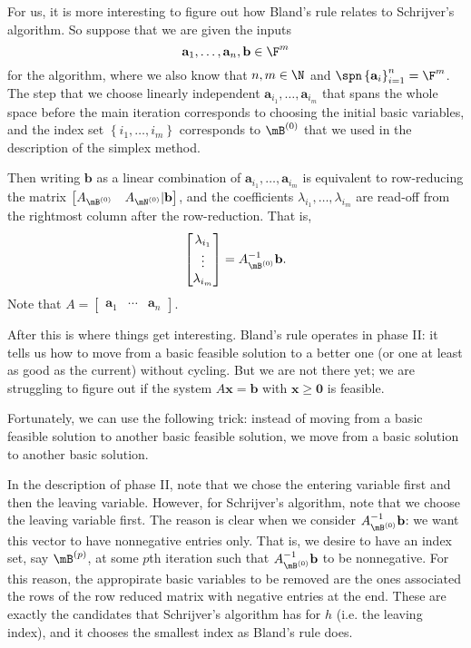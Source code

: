 \documentclass{article}
\renewcommand{\vec}{\mathbf}
\begin{document}
For us, it is more interesting to figure out how Bland's rule relates to Schrijver's algorithm. So suppose that we are given the inputs
\begin{equation*}
    \vec{a}_1,\ldots,\vec{a}_n,\vec{b}\in\F^m
\end{equation*}
for the algorithm, where we also know that $n,m\in\N$ and $\spn\left\lbrace \vec{a}_i \right\rbrace ^{n}_{i=1}=\F^m$. The step that we choose linearly independent $\vec{a}_{i_1},\ldots,\vec{a}_{i_m}$ that spans the whole space before the main iteration corresponds to choosing the initial basic variables, and the index set $\left\lbrace i_1,\ldots,i_m \right\rbrace$ corresponds to $\mB^{\left( 0 \right) }$ that we used in the description of the simplex method.

Then writing $\vec{b}$ as a linear combination of $\vec{a}_{i_1},\ldots,\vec{a}_{i_m}$ is equivalent to row-reducing the matrix $\begin{bmatrix}A_{\mB^{\left( 0 \right) }}&A_{\mN^{\left( 0 \right) }}|\vec{b}\end{bmatrix}$, and the coefficients $\lambda_{i_1},\ldots,\lambda_{i_m}$ are read-off from the rightmost column after the row-reduction. That is,
\begin{equation*}
    \begin{bmatrix} \lambda_{i_1}\\\vdots\\\lambda_{i_m} \end{bmatrix} = A_{\mB^{\left( 0 \right) }}^{-1} \vec{b}.
\end{equation*}
Note that $A=\begin{bmatrix} \vec{a}_1&\cdots&\vec{a}_n \end{bmatrix}$.

After this is where things get interesting. Bland's rule operates in phase II: it tells us how to move from a basic feasible solution to a better one (or one at least as good as the current) without cycling. But we are not there yet; we are struggling to figure out if the system $A\vec{x}=\vec{b}$ with $\vec{x}\geq\vec{0}$ is feasible.

Fortunately, we can use the following trick: instead of moving from a basic feasible solution to another basic feasible solution, we move from a basic solution to another basic solution.

In the description of phase II, note that we chose the entering variable first and then the leaving variable. However, for Schrijver's algorithm, note that we choose the leaving variable first. The reason is clear when we consider $A_{\mB^{\left( 0 \right) }}^{-1} \vec{b}$: we want this vector to have nonnegative entries only. That is, we desire to have an index set, say $\mB^{\left( p \right) }$, at some $p$th iteration such that $A_{\mB^{\left( 0 \right) }}^{-1} \vec{b}$ to be nonnegative. For this reason, the appropirate basic variables to be removed are the ones associated the rows of the row reduced matrix with negative entries at the end. These are exactly the candidates that Schrijver's algorithm has for $h$ (i.e. the leaving index), and it chooses the smallest index as Bland's rule does.
\end{document}
